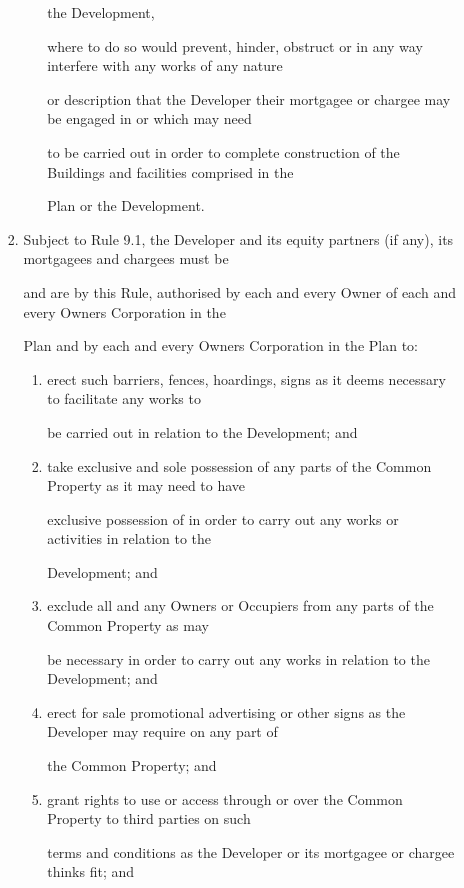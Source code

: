 \documentclass{article}
\begin{document}
\begin{enumerate}[label=\arabic*.]
\begin{enumerate}[label=\arabic{enumi}.\arabic*.]
\begin{enumerate}[label=(\arabic*)]
\begin{enumerate}[label=(\alph*)]
the Development, 

where to do so would prevent, hinder, obstruct or in any way interfere with any works of any nature 

or description that the Developer their mortgagee or chargee may be engaged in or which may need 

to be carried out in order to complete construction of the Buildings and facilities comprised in the 

Plan or the Development. 

\end{enumerate}
\item  Subject to Rule 9.1, the Developer and its equity partners (if any), its mortgagees and chargees must be 

and are by this Rule, authorised by each and every Owner of each and every Owners Corporation in the 

Plan and by each and every Owners Corporation in the Plan to: 

\begin{enumerate}[label=(\alph*)]
\item  erect such barriers, fences, hoardings, signs as it deems necessary to facilitate any works to 

be carried out in relation to the Development; and 

\item  take exclusive and sole possession of any parts of the Common Property as it may need to have 

exclusive possession of in order to carry out any works or activities in relation to the 

\newpage

Development; and 

\item  exclude all and any Owners or Occupiers from any parts of the Common Property as may 

be necessary in order to carry out any works in relation to the Development; and 

\item  erect for sale promotional advertising or other signs as the Developer may require on any part of 

the Common Property; and 

\item  grant rights to use or access through or over the Common Property to third parties on such 

terms and conditions as the Developer or its mortgagee or chargee thinks fit; and 


\end{enumerate}
\end{enumerate}
\end{enumerate}
\end{enumerate}
\end{document}
